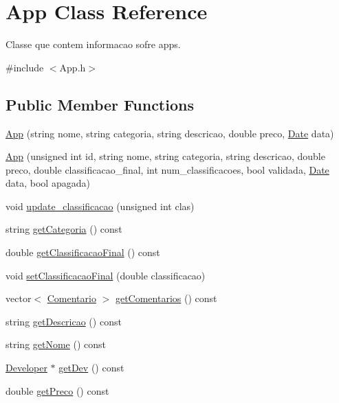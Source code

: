 \hypertarget{class_app}{\section{App Class Reference}
\label{class_app}
}


Classe que contem informacao sofre apps.  




{\ttfamily \#include $<$App.\+h$>$}

\subsection*{Public Member Functions}
\begin{DoxyCompactItemize}
\item 
\hyperlink{class_app_a38e0c0579af5de4a22afeac6f0afcc5e}{App} (string nome, string categoria, string descricao, double preco, \hyperlink{class_date}{Date} data)
\item 
\hyperlink{class_app_ac7da033f37aabccd99f4c77dc664ce4b}{App} (unsigned int id, string nome, string categoria, string descricao, double preco, double classificacao\+\_\+final, int num\+\_\+classificacoes, bool validada, \hyperlink{class_date}{Date} data, bool apagada)
\item 
void \hyperlink{class_app_ac720715c2e11bfc218842141b9c6e0d2}{update\+\_\+classificacao} (unsigned int clas)
\item 
string \hyperlink{class_app_a58076d5e40336d8f1489f49ebcc648ac}{get\+Categoria} () const 
\item 
double \hyperlink{class_app_a99b0df2b556e0d0967af13f37b47178e}{get\+Classificacao\+Final} () const 
\item 
void \hyperlink{class_app_a5b0357aee7ee3722ab97efca5c88a07b}{set\+Classificacao\+Final} (double classificacao)
\item 
vector$<$ \hyperlink{class_comentario}{Comentario} $>$ \hyperlink{class_app_a55940da54fefa49300678f6ce87eeb04}{get\+Comentarios} () const 
\item 
string \hyperlink{class_app_a2dcf86011e3b1e8dc8d027f4b4b4b253}{get\+Descricao} () const 
\item 
string \hyperlink{class_app_a7b94ca7878eb536a1d1b1448c2072bea}{get\+Nome} () const 
\item 
\hyperlink{class_developer}{Developer} $\ast$ \hyperlink{class_app_a94de3c0569d8c300a634c5e058da70da}{get\+Dev} () const 
\item 
double \hyperlink{class_app_a203cc8ebea02cf4cabb736c3c4e8bc51}{get\+Preco} () const 

\end{DoxyCompactItemize}
